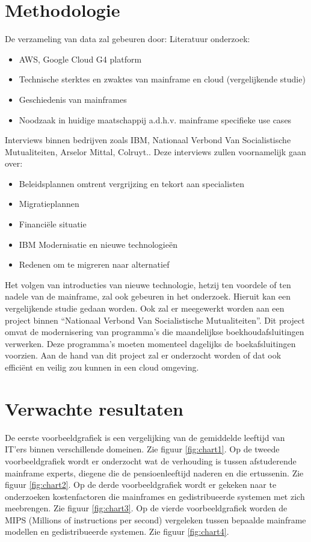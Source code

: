 \section{Methodologie} 
\label{sec:methodologie}
De verzameling van data zal gebeuren door: \newline
Literatuur onderzoek:
\begin{itemize}
    \item AWS, Google Cloud G4 platform 
    \item Technische sterktes en zwaktes van mainframe en cloud (vergelijkende studie)
    \item Geschiedenis van mainframes
    \item Noodzaak in huidige maatschappij a.d.h.v. mainframe specifieke use cases
\end{itemize}
Interviews binnen bedrijven zoals IBM, Nationaal Verbond Van Socialistische Mutualiteiten, Arselor Mittal, Colruyt.. Deze interviews zullen voornamelijk gaan over:
\begin{itemize}
     \item Beleidsplannen omtrent vergrijzing en tekort aan specialisten
     \item Migratieplannen
     \item Financiële situatie
     \item IBM Modernisatie en nieuwe technologieën 
     \item Redenen om te migreren naar alternatief
\end{itemize}
Het volgen van introducties van nieuwe technologie, hetzij ten voordele of ten nadele van de mainframe, zal ook gebeuren in het onderzoek. Hieruit kan een vergelijkende studie gedaan worden. Ook zal er meegewerkt worden aan een project binnen “Nationaal Verbond Van Socialistische Mutualiteiten”. Dit project omvat de modernisering van programma’s die maandelijkse boekhoudafsluitingen verwerken. Deze programma’s moeten momenteel dagelijks de boekafsluitingen voorzien. Aan de hand van dit project zal er onderzocht worden of dat ook efficiënt en veilig zou kunnen in een cloud omgeving. \newpage
\section{Verwachte resultaten}
\label{sec:verwachte_resultaten}
De eerste voorbeeldgrafiek is een vergelijking van de gemiddelde leeftijd van IT'ers binnen verschillende domeinen. Zie figuur \ref{fig:chart1}. \newline
Op de tweede voorbeeldgrafiek wordt er onderzocht wat de verhouding is tussen afstuderende mainframe experts, diegene die de pensioenleeftijd naderen en die ertussenin. Zie figuur \ref{fig:chart2}. \newline
Op de derde voorbeeldgrafiek wordt er gekeken naar te onderzoeken kostenfactoren die mainframes en gedistribueerde systemen met zich meebrengen. Zie figuur \ref{fig:chart3}. \newline
Op de vierde voorbeeldgrafiek worden de MIPS (Millions of instructions per second) vergeleken tussen bepaalde mainframe modellen en gedistribueerde systemen. Zie figuur \ref{fig:chart4}. \newline


